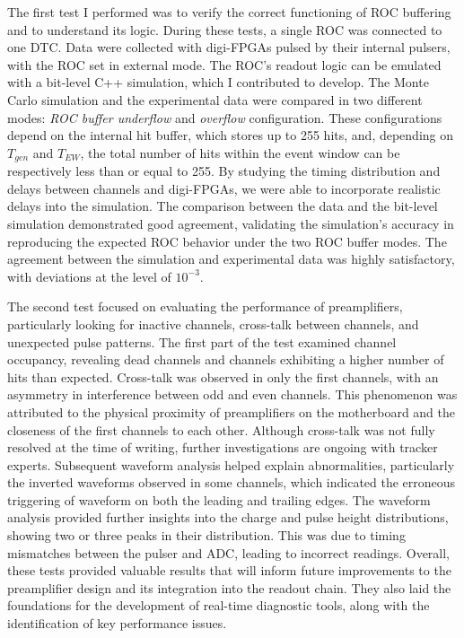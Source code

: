 The first test I performed was to verify the 
correct functioning of 
ROC buffering and to understand its logic. 
During these tests, a single 
ROC was connected to one DTC. Data were 
collected with digi-FPGAs pulsed 
by their internal pulsers, with the ROC set 
in external mode. The ROC's  
readout logic can be emulated with a bit-level 
C++ simulation, which I 
contributed to develop. The Monte Carlo simulation 
and the experimental 
data were compared in two different modes: 
\textit{ROC buffer underflow} and \textit{overflow} 
configuration. These configurations depend on the 
internal hit buffer, which stores up to 255 hits, 
and, depending on \( T_{gen} \) and \( T_{EW} \), 
the total number of hits within the event window 
can be respectively 
less than or equal to 255. 
By studying the timing distribution and delays 
between channels and digi-FPGAs, we 
were able to incorporate realistic delays into 
the simulation. The comparison 
between the data and the bit-level simulation 
demonstrated good agreement, 
validating the simulation's accuracy in reproducing 
the expected ROC behavior under 
the two ROC buffer modes. The agreement between 
the simulation and 
experimental data was highly satisfactory, with 
deviations at the level of \( 10^{-3} \).

The second test focused on evaluating the 
performance of preamplifiers, 
particularly looking for inactive channels, 
cross-talk between channels, 
and unexpected pulse patterns. The first part 
of the test examined channel occupancy, revealing 
dead channels and channels exhibiting a higher 
number of hits than expected. 
Cross-talk was observed in only the first channels, 
with an asymmetry in interference 
between odd and even channels. This phenomenon was 
attributed to the physical proximity 
of preamplifiers on the motherboard and the 
closeness of the first channels to each other. 
Although cross-talk was not fully resolved at 
the time of writing, further investigations 
are ongoing with tracker experts.
Subsequent waveform analysis helped explain 
abnormalities, particularly the inverted 
waveforms observed in some channels, which indicated 
the erroneous triggering of waveform 
on both the leading and trailing edges. The 
waveform analysis 
provided further insights into the charge and 
pulse height distributions, showing two or 
three peaks in their distribution. This was due 
to timing mismatches between the pulser 
and ADC, leading to incorrect readings. Overall, 
these tests provided valuable results 
that will inform future improvements to the 
preamplifier design and its integration into 
the readout chain. They also laid the foundations 
for the development of real-time 
diagnostic tools, along with the identification of 
key performance issues.

